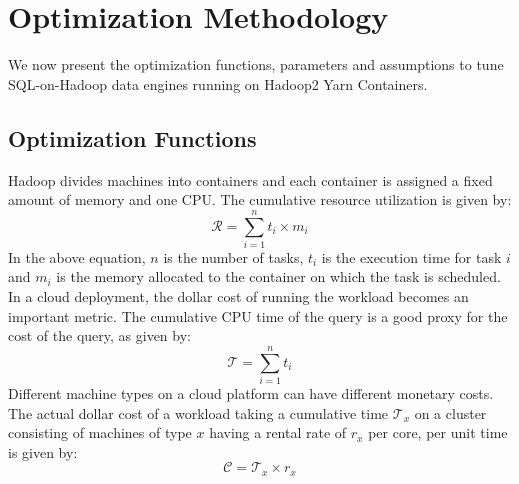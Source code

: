 \section{Optimization Methodology}
\label{sec:optmethod}
We now present the optimization functions, parameters and assumptions to tune SQL-on-Hadoop data engines running on Hadoop2 Yarn Containers. 

\subsection{Optimization Functions}
 Hadoop divides machines into containers and each container is assigned a fixed amount of memory and one CPU.  The cumulative resource utilization is given by:
\begin{equation}
\label{eqn:totalresource}
\mathcal{R} = \sum_{i=1}^{n} t_i \times m_i
\end{equation}
In the above equation, $n$ is the number of tasks, $t_i$ is the execution time for task $i$ and $m_i$ is the memory allocated to the container on which the task is scheduled.  In a cloud deployment, the dollar cost of running the workload becomes an important metric.  The cumulative CPU time of the query is a good proxy for the cost of the query, as given by: 
\begin{equation}
\label{eqn:totaltime}
\mathcal{T} = \sum_{i=1}^{n} t_i
\end{equation}
Different machine types on a cloud platform can have different monetary costs. The actual dollar cost of a workload taking a cumulative time $\mathcal{T}_x$ on a cluster consisting of machines of type $x$ having a rental rate of $r_x$ per core, per unit time is given by: 
\begin{equation}
\label{eqn:totalcost}
\mathcal{C} = \mathcal{T}_x \times r_x
\end{equation}

